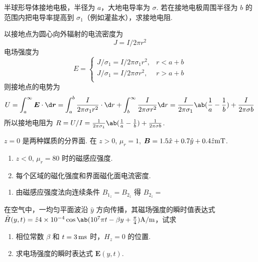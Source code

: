 \documentclass[fontset = fandol]{ctexart}
\begin{document}
\begin{textfig}[ratio = 3:1]
  \begin{problem}[10 pt]
    半球形导体接地电极，半径为 $a$，大地电导率为 $\sigma$.
    若在接地电极周围半径为 $b$ 的范围内把电导率提高到 $\sigma_1$（例如灌盐水），求接地电阻.
  \end{problem}
  \textfigsplit\centering
\end{textfig}
\begin{solution}
  以接地点为圆心向外辐射的电流密度为
  \[J = I/2\pi r^2\]
  电场强度为
  \[
    E =
    \begin{cases}
      J/\sigma_1 = I/2\pi\sigma_1r^2, & r < a + b\\
      J/\sigma_1 = I/2\pi\sigma r^2, & r > a + b\\
    \end{cases}
  \]
  则接地点的电势为
  \[
    U = \int_a^\infty \bm E \cdot \d\bm r
      = \int_a^b \frac{I}{2\pi\sigma_1 r^2} \cdot \d r +
        \int_b^\infty \frac{I}{2\pi\sigma r^2} \d r
      = \frac{I}{2\pi\sigma_1} \ab(\frac1a - \frac1b) + \frac{I}{2\pi\sigma b}
  \]
  所以接地电阻为 $R = U/I = \frac{1}{2\pi\sigma_1}
    \ab(\frac1a - \frac1b) + \frac{1}{2\pi\sigma b}$.
\end{solution}

\begin{problem}[10 pt]
  $z = 0$ 是两种媒质的分界面. 在 $z > 0$, $\mu_r = 1$, $\bm B = 1.5\hat x + 0.7\hat y + 0.4\hat z\unit\mT$.
  \begin{enumerate}
    \item $z < 0$, $\mu_r = 80$ 时的磁感应强度.
    \item 每个区域的磁化强度和界面磁化面电流密度.
  \end{enumerate}
\end{problem}
\begin{solution}
  \begin{enumerate}
    \item 由磁感应强度法向连续条件 $B_{1_z} = B_{2_z}$ 得 $B_{2_z} = $
  \end{enumerate}
\end{solution}

\begin{problem}[10 pt]
  在空气中，一均匀平面波沿 $\hat y$ 方向传播，其磁场强度的瞬时值表达式
  $\tilde H(y,t) = \hat z \num{4e-4}\cos\ab(\num{e7}\pi t - \beta y + \frac\pi4)\unit{\A/\m}$，试求
  \begin{enumerate}
    \item 相位常数 $\beta$ 和 $t = \qty3\ms$ 时，$H_z = 0$ 的位置.
    \item 求电场强度的瞬时表达式 $\bm E(y,t)$.
  \end{enumerate}
\end{problem}
\end{document}
